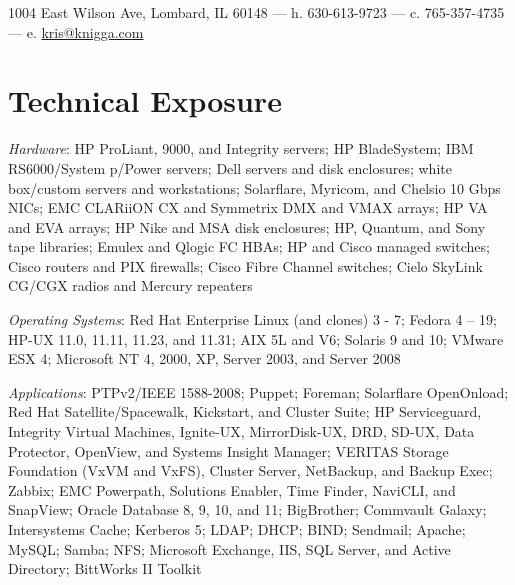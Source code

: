 \documentclass[9pt]{extarticle} %
\begin{document}



1004 East Wilson Ave, Lombard, IL 60148 \hfill --- \hfill h. 630-613-9723 \hfill --- \hfill c. 765-357-4735 \hfill --- \hfill e. \href{mailto:kris@knigga.com}{kris@knigga.com}


\section{Technical Exposure}

\textit{Hardware}: HP ProLiant, 9000, and Integrity servers; HP BladeSystem; IBM RS6000/System p/Power servers; Dell servers and disk enclosures; white box/custom servers and workstations; Solarflare, Myricom, and Chelsio 10 Gbps NICs; EMC CLARiiON CX and Symmetrix DMX and VMAX arrays; HP VA and EVA arrays; HP Nike and MSA disk enclosures; HP, Quantum, and Sony tape libraries; Emulex and Qlogic FC HBAs; HP and Cisco managed switches; Cisco routers and PIX firewalls; Cisco Fibre Channel switches; Cielo SkyLink CG/CGX radios and Mercury repeaters

\bigskip

\textit{Operating Systems}: Red Hat Enterprise Linux (and clones) 3 - 7; Fedora 4 -- 19; HP-UX 11.0, 11.11, 11.23, and 11.31; AIX 5L and V6; Solaris 9 and 10; VMware ESX 4; Microsoft NT 4, 2000, XP, Server 2003, and Server 2008

\bigskip

\textit{Applications}: PTPv2/IEEE 1588-2008; Puppet; Foreman; Solarflare OpenOnload; Red Hat Satellite/Spacewalk, Kickstart, and Cluster Suite; HP Serviceguard, Integrity Virtual Machines, Ignite-UX, MirrorDisk-UX, DRD, SD-UX, Data Protector, OpenView, and Systems Insight Manager; VERITAS Storage Foundation (VxVM and VxFS), Cluster Server, NetBackup, and Backup Exec; Zabbix; EMC Powerpath, Solutions Enabler, Time Finder, NaviCLI, and SnapView; Oracle Database 8, 9, 10, and 11; BigBrother; Commvault Galaxy; Intersystems Cache; Kerberos 5; LDAP; DHCP; BIND; Sendmail; Apache; MySQL; Samba; NFS; Microsoft Exchange, IIS, SQL Server, and Active Directory; BittWorks II Toolkit
\end{document}
